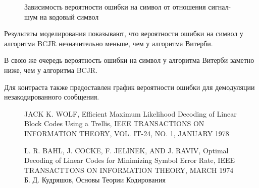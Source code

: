 \documentclass{ITaSconf}
\begin{document}
\begin{figure} [h]
\caption{Зависимость вероятности ошибки на символ от отношения сигнал-шум на кодовый символ}


\label{fig:block}
\end{figure}

Результаты моделирования показывают, что вероятности ошибки на символ у алгоритма  BCJR незначительно меньше, чем у  алгоритма Витерби.

В свою же очередь вероятность ошибки на символ у алгоритма Витерби заметно ниже, чем у алгоритма BCJR.

Для контраста также предоставлен график вероятности ошибки для демодуляции незакодированного сообщения. 


\begin{figure}
\begin{thebibliography}{9}

JACK K. WOLF, Efficient Maximum Likelihood Decoding of Linear Block Codes Using a Trellis,
IEEE TRANSACTIONS ON INFORMATION THEORY, VOL. IT-24, NO. 1, JANUARY 1978

L. R. BAHL, J. COCKE, F. JELINEK, AND J. RAVIV, Optimal Decoding of Linear Codes for Minimizing Symbol Error Rate, IEEE TRANSACTTONS ON INFORMATION THEORY, MARCH 1974
Б. Д. Кудряшов, Основы Теории Кодирования
\end{thebibliography}
\end{figure}
\end{document}
